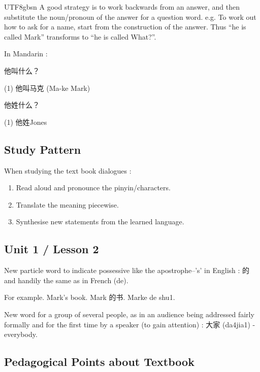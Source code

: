\documentclass{article}
\newcommand{\myfont}{gbsn} %
\begin{document}
\begin{CJK}{UTF8}{\myfont}
A good strategy is to work backwards from an answer, and then substitute the noun/pronoun of the answer for a question word.   e.g.   To work out how to ask for a name, start from the construction of the answer.  Thus ``he is called Mark'' transforms to ``he is called What?''.

In Mandarin :

\begin{question}
  他叫什么？
  \begin{tasks}(1)
  \task 他叫马克 (Ma-ke Mark)
  \end{tasks}
\end{question}

\begin{question}
  他姓什么？
  \begin{tasks}(1)
  \task 他姓Jones
  \end{tasks}
\end{question}

\subsection{Study Pattern}

When studying the text book dialogues :

\begin{enumerate}
\item Read aloud and pronounce the pinyin/characters.
\item Translate the meaning piecewise.
\item Synthesise new statements from the learned language.
\end{enumerate}

\subsection{Unit 1 / Lesson 2}

New particle word to indicate possessive like the apostrophe--'s' in English : 的  and handily the same as in French (de).

For example.  Mark's book.  Mark 的书.  Marke de shu1.

New word for a group of several people, as in an audience being addressed fairly formally and for the first time by a speaker (to gain attention) : 大家 (da4jia1)  - everybody.

\subsection{Pedagogical Points about Textbook}


\end{CJK}
\end{document}
